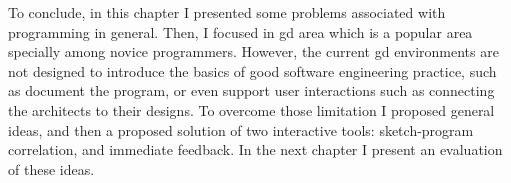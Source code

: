 To conclude, in this chapter I presented some problems associated with programming in general. Then, I focused in \gls{gd} area which is a popular area specially among novice programmers. However, the current \gls{gd} environments are not designed to introduce the basics of good software engineering practice, such as document the program, or even support user interactions such as connecting the architects to their designs. To overcome those limitation I proposed general ideas, and then a proposed solution of two interactive tools: sketch-program correlation, and immediate feedback. In the next chapter I present an evaluation of these ideas.